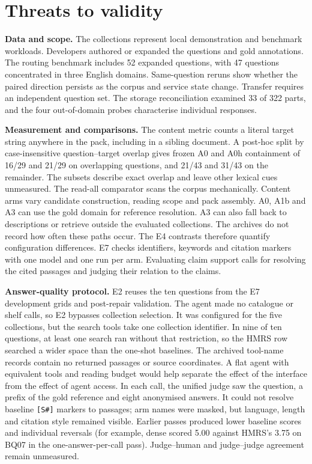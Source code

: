 \section{Threats to validity}
\label{sec:threats}

\noindent\textbf{Data and scope.} The collections represent local
demonstration and benchmark workloads. Developers authored or expanded the
questions and gold annotations. The routing benchmark includes 52 expanded
questions, with 47 questions concentrated in three English domains.
Same-question reruns show whether the paired direction persists as the
corpus and service state change. Transfer requires an independent question
set. The storage reconciliation examined 33 of 322 parts, and the four
out-of-domain probes characterise individual responses.

\noindent\textbf{Measurement and comparisons.} The content metric counts a
literal target string anywhere in the pack, including in a sibling
document. A post-hoc split by case-insensitive question--target overlap
gives frozen A0 and A0h containment of
16/29 and 21/29 on overlapping questions, and 21/43 and 31/43 on the
remainder. The subsets describe exact overlap and leave other lexical
cues unmeasured. The read-all comparator scans the corpus mechanically.
Content arms vary candidate construction, reading scope and pack assembly.
A0, A1b and A3 can use the gold domain for reference resolution. A3 can
also fall back to descriptions or retrieve outside the evaluated collections.
The archives do not record how often these paths occur. The E4 contrasts
therefore quantify configuration differences. E7 checks identifiers,
keywords and citation markers with one model and one run per arm.
Evaluating claim support calls for resolving the cited passages and judging
their relation to the claims.

\noindent\textbf{Answer-quality protocol.} E2 reuses the ten questions from
the E7 development grids and post-repair validation. The agent made no
catalogue or shelf calls, so E2 bypasses collection selection. It was
configured for the five collections, but the search tools take one
collection identifier. In nine of ten questions, at least one search ran
without that restriction, so the HMRS row searched a wider space than the
one-shot baselines. The archived tool-name records
contain no returned passages or source coordinates. A flat agent with
equivalent tools and reading budget would
help separate the effect of the interface from the effect of agent access.
In each call, the unified judge saw the question, a prefix of the gold
reference and eight anonymised answers. It could not resolve baseline
\texttt{[S\#]} markers to passages; arm names were masked, but language,
length and citation style remained visible. Earlier passes produced lower
baseline scores and individual reversals (for example, dense scored 5.00
against HMRS's 3.75 on BQ07 in the one-answer-per-call pass). Judge--human
and judge--judge agreement remain unmeasured.


